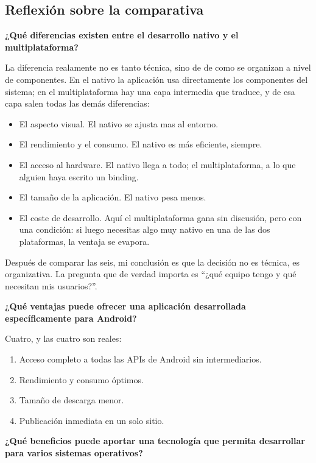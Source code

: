 \documentclass[11pt,a4paper]{article}
\newcommand{\campo}[1]{\textbf{\color{ink}#1}}
\begin{document}
	\subsection{Reflexión sobre la comparativa}
	
	\campo{¿Qué diferencias existen entre el desarrollo nativo y el multiplataforma?}
	
	La diferencia realamente no es tanto técnica, sino de de como se organizan a nivel de componentes. En el nativo la aplicación usa directamente los componentes del sistema; en el multiplataforma hay una capa intermedia que traduce, y de esa capa salen todas las demás diferencias:
	\begin{itemize}[leftmargin=*,itemsep=0.2em,topsep=0.2em]
		\item El aspecto visual. El nativo se ajusta mas al entorno.
		\item El rendimiento y el consumo. El nativo es más eficiente, siempre.
		\item El acceso al hardware. El nativo llega a todo; el multiplataforma, a lo que alguien haya escrito un binding.
		\item El tamaño de la aplicación. El nativo pesa menos.
		\item El coste de desarrollo. Aquí el multiplataforma gana sin discusión, pero con una condición: si luego necesitas algo muy nativo en una de las dos plataformas, la ventaja se evapora.
	\end{itemize}
	
	Después de comparar las seis, mi conclusión es que la decisión no es técnica, es organizativa. La pregunta que de verdad importa es \enquote{¿qué equipo tengo y qué necesitan mis usuarios?}.
	
	\campo{¿Qué ventajas puede ofrecer una aplicación desarrollada específicamente para Android?}
	
	Cuatro, y las cuatro son reales:
	\begin{enumerate}[leftmargin=*,itemsep=0.1em]
		\item Acceso completo a todas las APIs de Android sin intermediarios.
		\item Rendimiento y consumo óptimos.
		\item Tamaño de descarga menor.
		\item Publicación inmediata en un solo sitio.
	\end{enumerate}
	
	\campo{¿Qué beneficios puede aportar una tecnología que permita desarrollar para varios sistemas operativos?}
	
\end{document}
